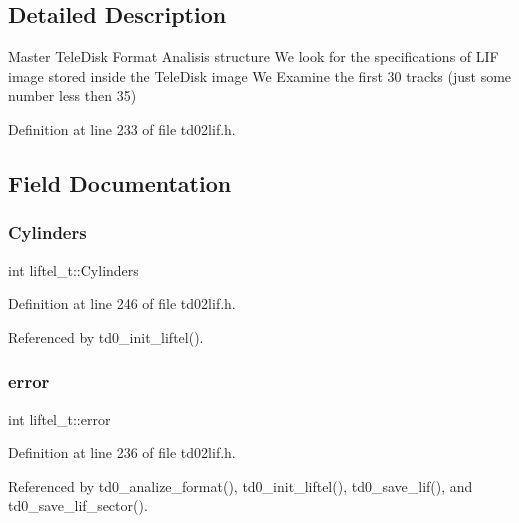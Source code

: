 \subsection{Detailed Description}
Master Tele\+Disk Format Analisis structure We look for the specifications of L\+IF image stored inside the Tele\+Disk image We Examine the first 30 tracks (just some number less then 35) 

Definition at line 233 of file td02lif.\+h.



\subsection{Field Documentation}
\mbox{\label{structliftel__t_aa7893691b509641459d8c1c0a8664aa5}} 
\subsubsection{\texorpdfstring{Cylinders}{Cylinders}}
{\footnotesize\ttfamily int liftel\+\_\+t\+::\+Cylinders}



Definition at line 246 of file td02lif.\+h.



Referenced by td0\+\_\+init\+\_\+liftel().

\mbox{\label{structliftel__t_abc69ee3835be72037c41a11b7457cecd}} 
\subsubsection{\texorpdfstring{error}{error}}
{\footnotesize\ttfamily int liftel\+\_\+t\+::error}



Definition at line 236 of file td02lif.\+h.



Referenced by td0\+\_\+analize\+\_\+format(), td0\+\_\+init\+\_\+liftel(), td0\+\_\+save\+\_\+lif(), and td0\+\_\+save\+\_\+lif\+\_\+sector().

\mbox{\label{structliftel__t_a2269b4ce15afd4b98369c38752d31037}} 
